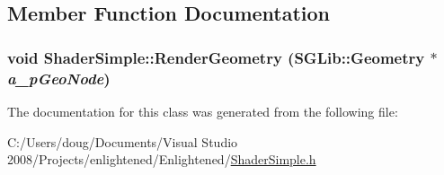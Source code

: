 \subsection{Member Function Documentation}
\hypertarget{class_shader_simple_a33f530c83a2614259c86aef8533c7450}{
\subsubsection[{RenderGeometry}]{\setlength{\rightskip}{0pt plus 5cm}void ShaderSimple::RenderGeometry (SGLib::Geometry $\ast$ {\em a\_\-pGeoNode})}}
\label{class_shader_simple_a33f530c83a2614259c86aef8533c7450}


The documentation for this class was generated from the following file:\begin{DoxyCompactItemize}
\item 
C:/Users/doug/Documents/Visual Studio 2008/Projects/enlightened/Enlightened/\hyperlink{_shader_simple_8h}{ShaderSimple.h}\end{DoxyCompactItemize}
